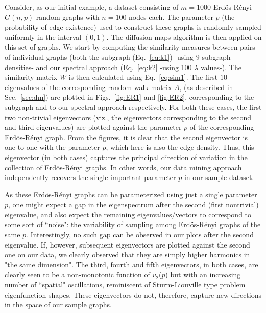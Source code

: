 Consider, as our initial example, a dataset consisting of $m=1000$
Erd\"{o}s-R\'{e}nyi $G(n,p)$ random graphs \cite{Erd59random} with
$n=100$ nodes each.
% 
The parameter $p$ (the probability of edge existence) used to
construct these graphs is randomly sampled uniformly in the interval
$(0,1)$.
% 
The diffusion maps algorithm is then applied on this set of graphs.
% 
We start by computing the similarity measures between pairs of
individual graphs (both the subgraph (Eq.~\ref{eq:k1}) -using $9$
subgraph densities- and our spectral approach (Eq.~\ref{eq:k2} -using
100 $\lambda$ values-).
% 
The similarity matrix $W$ is then calculated using Eq.~\ref{eq:sim1}.
% 
The first $10$ eigenvalues of the corresponding random walk matrix
$A$, (as described in Sec.~\ref{sec:dm}) are plotted in
Figs.~\ref{fig:ER1} and \ref{fig:ER2}, corresponding to the subgraph
and to our spectral approach respectively.
% 
For both these cases, the first two non-trivial eigenvectors (viz.,
the eigenvectors corresponding to the second and third eigenvalues)
are plotted against the parameter $p$ of the corresponding
Erd\"{o}s-R\'{e}nyi graph.
% 
From the figures, it is clear that the second eigenvector is
one-to-one with the parameter $p$, which here is also the
edge-density.
% 
Thus, this eigenvector (in both cases) captures the principal
direction of variation in the collection of Erd\"{o}s-R\'{e}nyi
graphs.
% 
In other words, our data mining approach independently recovers the
single important parameter $p$ in our sample dataset.
% 

As these Erd\"{o}s-R\'{e}nyi graphs can be parameterized using just a
single parameter $p$, one might expect a gap in the eigenspectrum
after the second (first nontrivial) eigenvalue, and also expect the
remaining eigenvalues/vectors to correspond to some sort of ``noise":
the variability of sampling among Erd\"{o}s-R\'{e}nyi graphs of the
same $p$.
% 
Interestingly, no such gap can be observed in our plots after the
second eigenvalue.
% 
If, however, subsequent eigenvectors are plotted against the second
one on our data, we clearly observed that they are simply higher
harmonics in "the same dimension".
% 
The third, fourth and fifth eigenvectors, in both cases, are clearly
seen to be a non-monotonic function of $v_2$($p$) but with an
increasing number of ``spatial" oscillations, reminiscent of
Sturm-Liouville type problem eigenfunction shapes.
% 
These eigenvectors do not, therefore, capture new directions in the
space of our sample graphs.
% 

